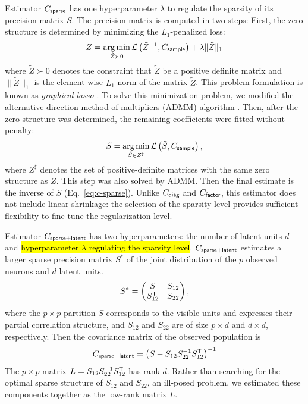 \documentclass[10pt]{article}
\newcommand{\loss}[1]{\mathcal L\left(#1\right)}
\newcommand{\T}{{\sf T}}
\DeclareMathOperator*{\argmin}{arg\,min}
\begin{document}
Estimator $C_{\sf sparse}$  has one hyperparameter $\lambda$ to regulate the sparsity of its precision matrix $S$. The precision matrix is computed in two steps: First, the zero structure is determined by minimizing the $L_1$-penalized loss:
\begin{equation}
Z = \argmin\limits_{\tilde Z \succ 0} \loss{{\tilde Z}^{-1},C_{\sf sample}} + \lambda \|\tilde Z \|_1
\end{equation}
where $\tilde Z\succ 0$ denotes the constraint that $\tilde Z$ be a positive definite matrix and $\|\tilde Z\|_1$ is the element-wise $L_1$ norm of the matrix $\tilde Z$. This problem formulation is known as \emph{graphical lasso} \cite{Meinshausen:2006, Friedman:2008}. To solve this minimization problem, we modified the alternative-direction method of multipliers (ADMM) algorithm \cite{Ma:2013}. 
Then, after the zero structure was determined, the remaining coefficients were fitted without penalty:
\begin{equation}
S = \argmin\limits_{\tilde S \in Z^\sharp} \loss{\tilde S,C_{\sf sample}},
\end{equation}
where $Z^\sharp$ denotes the set of positive-definite matrices with the same zero structure as $Z$.  This step was also solved by ADMM.  Then the final estimate is the inverse of $S$ (Eq.~\ref{eq:c-sparse}). Unlike $C_{\sf diag}$ and $C_{\sf factor}$, this estimator does not include linear shrinkage: the selection of the sparsity level provides sufficient flexibility to fine tune the regularization level.

Estimator $C_{\sf sparse+latent}$ has two hyperparameters: the number of latent units $d$ and \hl{hyperparameter $\lambda$ regulating the sparsity level}. $C_{\sf sparse+latent}$ estimates a larger sparse precision matrix $S^\ast$ of the joint distribution of the $p$ observed neurons and $d$ latent units.  
\begin{equation}
S^\ast=
\begin{pmatrix}
S & S_{12} \\
S_{12}^\T & S_{22}
\end{pmatrix},
\end{equation}
where the $p\times p$ partition $S$ corresponds to the visible units and expresses their partial correlation structure, and $S_{12}$ and $S_{22}$ are of size $p\times d$ and $d\times d$, respectively. 
Then the covariance matrix of the observed population is 
\begin{equation}
C_{\sf sparse+latent} = \left(S-S_{12}S_{22}^{-1}S_{12}^\T\right)^{-1}
\end{equation}
The $p\times p$  matrix $L=S_{12}S_{22}^{-1}S_{12}^\T$ has rank $d$. Rather than searching for the optimal sparse structure of $S_{12}$ and $S_{22}$, an ill-posed problem, we estimated these components together as the low-rank matrix $L$.
\end{document}
